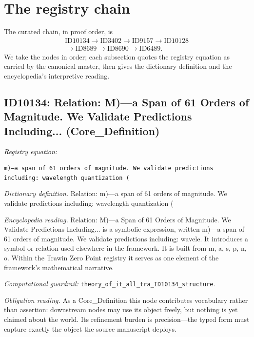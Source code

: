 \documentclass[11pt]{article}
\theoremstyle{remark}
\begin{document}
\section{The registry chain}
\label{sec:chain}

The curated chain, in proof order, is
\begin{equation*}
\begin{gathered}
\text{ID10134} \to \text{ID3402} \to \text{ID9157} \to \text{ID10128} \\
\to \text{ID8689} \to \text{ID8690} \to \text{ID6489}.
\end{gathered}
\end{equation*}
We take the nodes in order; each subsection quotes the registry equation as carried by the canonical master, then gives the dictionary definition and the encyclopedia's interpretive reading.

\subsection{ID10134: Relation: M)---a Span of 61 Orders of Magnitude. We Validate Predictions Including... (Core\_Definition)}

\noindent\textit{Registry equation:}\par
{\small\texttt{m)---a span of 61 orders of magnitude. We validate predictions including: wavelength quantization (}}\par\medskip
\noindent\textit{Dictionary definition.} Relation: m)---a span of 61 orders of magnitude. We validate predictions including: wavelength quantization (\par\medskip
\noindent\textit{Encyclopedia reading.} Relation: M)---a Span of 61 Orders of Magnitude. We Validate Predictions Including... is a symbolic expression, written m)---a span of 61 orders of magnitude. We validate predictions including: wavele. It introduces a symbol or relation used elsewhere in the framework. It is built from m, a, s, p, n, o. Within the Trawin Zero Point registry it serves as one element of the framework's mathematical narrative.
\par\medskip\noindent\textit{Computational guardrail:} \texttt{theory\_of\_it\_all\_tra\_ID10134\_structure}.
\par\medskip\noindent\textit{Obligation reading.} As a Core\_Definition this node contributes vocabulary rather than assertion: downstream nodes may use its object freely, but nothing is yet claimed about the world. Its refinement burden is precision---the typed form must capture exactly the object the source manuscript deploys.
\end{document}
